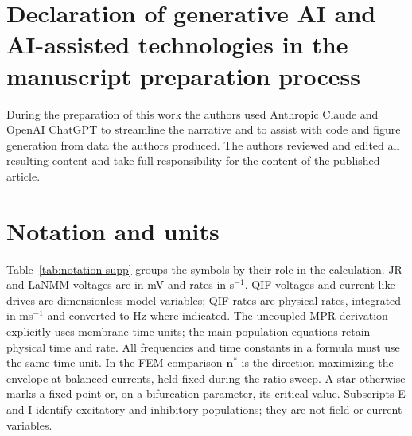 \documentclass[11pt,a4paper]{article}
\newif\ifsupp
\begin{document}
\section*{Declaration of generative AI and AI-assisted technologies in the manuscript
preparation process}
During the preparation of this work the authors used Anthropic Claude and OpenAI ChatGPT to
streamline the narrative and to assist with code and figure generation from data the authors
produced. The authors reviewed and edited all resulting content and take full responsibility
for the content of the published article.




\fi
\clearpage
\appendix
\makeatletter
\let\ne@stdsection\section
\renewcommand{\section}{\clearpage\ne@stdsection}
\makeatother
\ifsupp
\section*{Notation and units}\label{app:notation-supp}
\def\notationtablelabel{tab:notation-supp}
Table~\ref{\notationtablelabel} groups the symbols by their role in the calculation.
JR and LaNMM voltages are in mV and rates in s$^{-1}$. QIF voltages and current-like
drives are dimensionless model variables; QIF rates are physical rates, integrated
in ms$^{-1}$ and converted to Hz where indicated. The uncoupled MPR derivation explicitly uses membrane-time units; the main
population equations retain physical time and rate. All frequencies and time
constants in a formula must use the same time unit. In the FEM comparison $\mathbf n^*$ is the direction maximizing the envelope
at balanced currents, held fixed during the ratio sweep. A star otherwise marks a fixed point or,
on a bifurcation parameter, its critical value. Subscripts E and I identify
excitatory and inhibitory populations; they are not field or current variables.
\end{document}
